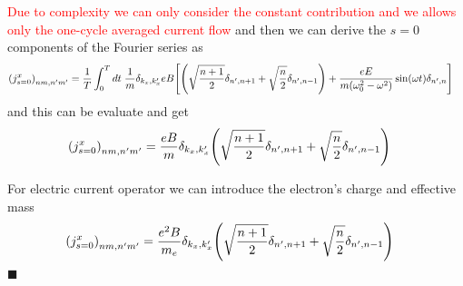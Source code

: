 \textcolor{red}{Due to complexity we can only consider the constant contribution and we allows only the one-cycle averaged current flow} and then we can derive the $s=0$ components of the Fourier series as
\begin{equation} \label{6.14}
  \begin{aligned}
    \qty({j}^x_{s=0})_{nm,n'm'} & =
    \frac{1}{T} \int_0^T dt \;
    \frac{1}{{m}}
    \delta_{k_x,k'_x}
    eB
    \qty[
    \qty(\sqrt{\frac{n+1}{2}} \delta_{n',n+1} + \sqrt{\frac{n}{2}}
    \delta_{n',n-1})
    + \frac{eE}{m(\omega_0^2 - \omega^2)}\sin(\omega t) \delta_{n',n}
    ]
  \end{aligned}
\end{equation}
and this can be evaluate and get
\begin{equation} \label{6.15}
  \begin{aligned}
    \qty({j}^x_{s=0})_{nm,n'm'} & =
    \frac{eB}{{m}}
    \delta_{k_x,k'_x}
    \qty(\sqrt{\frac{n+1}{2}} \delta_{n',n+1} + \sqrt{\frac{n}{2}}
    \delta_{n',n-1})
  \end{aligned}
\end{equation}

\noindent
For electric current operator we can introduce the electron's charge and effective mass
\begin{equation} \label{6.16}
  \begin{aligned}
    \qty({j}^x_{s=0})_{nm,n'm'} & =
    \frac{e^2B}{{m_e}}
    \delta_{k_x,k'_x}
    \qty(\sqrt{\frac{n+1}{2}} \delta_{n',n+1} + \sqrt{\frac{n}{2}}
    \delta_{n',n-1})
  \end{aligned}
\end{equation}
\hfill$\blacksquare$

